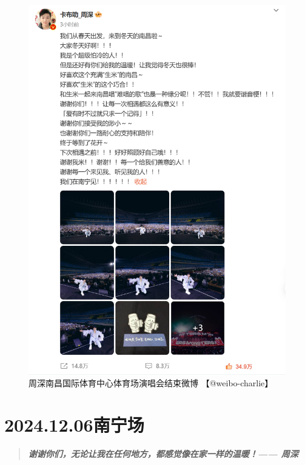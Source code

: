 \documentclass[]{ctexbook}
\begin{document}
\begin{figure}

{\centering \includegraphics{img/weibo/nanchang-20241123} 

}

\caption{周深南昌国际体育中心体育场演唱会结束微博 【@weibo-charlie】}\label{fig:unnamed-chunk-149}
\end{figure}

\chapter{2024.12.06南宁场}\label{nanning-20241206}

\begin{quote}
\textbf{\emph{谢谢你们，无论让我在任何地方，都感觉像在家一样的温暖！------ 周深}}
\end{quote}
\end{document}
